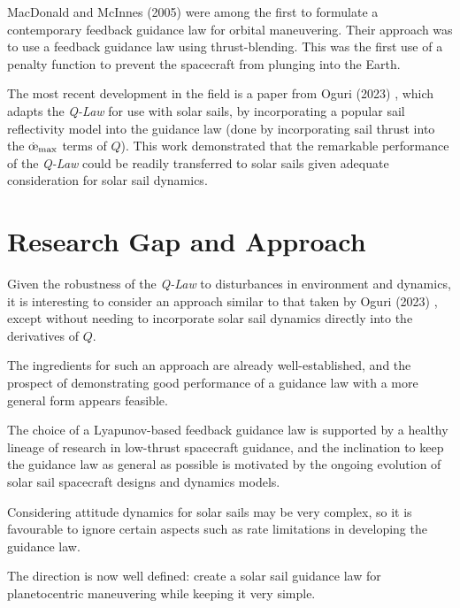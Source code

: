 MacDonald and McInnes (2005) \cite{macdonald2005analytical} were among the first to formulate a contemporary feedback guidance law for orbital maneuvering. Their approach was to use a feedback guidance law using thrust-blending. This was the first use of a penalty function to prevent the spacecraft from plunging into the Earth.

The most recent development in the field is a paper from Oguri (2023) \cite{oguri2023solar}, which adapts the \textit{Q-Law} for use with solar sails, by incorporating a popular sail reflectivity model into the guidance law (done by incorporating sail thrust into the \(\dot{\moe}_{\max}\) terms of \(Q\)). This work demonstrated that the remarkable performance of the \textit{Q-Law} could be readily transferred to solar sails given adequate consideration for solar sail dynamics.

\section{Research Gap and Approach}
Given the robustness of the \textit{Q-Law} to disturbances in environment and dynamics, it is interesting to consider an approach similar to that taken by Oguri (2023) \cite{oguri2023solar}, except without needing to incorporate solar sail dynamics directly into the derivatives of \(Q\).

The ingredients for such an approach are already well-established, and the prospect of demonstrating good performance of a guidance law with a more general form appears feasible.

The choice of a Lyapunov-based feedback guidance law is supported by a healthy lineage of research in low-thrust spacecraft guidance, and the inclination to keep the guidance law as general as possible is motivated by the ongoing evolution of solar sail spacecraft designs and dynamics models.

Considering attitude dynamics for solar sails may be very complex, so it is favourable to ignore certain aspects such as rate limitations in developing the guidance law.

The direction is now well defined: create a solar sail guidance law for planetocentric maneuvering while keeping it very simple.